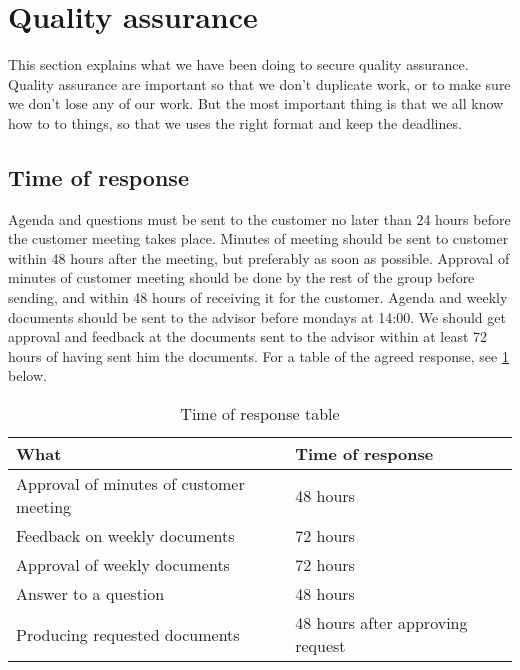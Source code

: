 \section{Quality assurance}
This section explains what we have been doing to secure quality assurance. Quality assurance are important so that we don't duplicate work, or to make sure we don't  lose any of our work. But the most important thing is that we all know how to to things, so that we uses the right format and keep the deadlines.

\newpage

\subsection{Time of response}
Agenda and questions must be sent to the customer no later than 24 hours before the customer meeting takes place. 
Minutes of meeting should be sent to customer within 48 hours after the meeting, but preferably as soon as possible.
Approval of minutes of customer meeting should be done by the rest of the group before sending, and within 48 hours of receiving it for the customer. Agenda and weekly documents should be sent to the advisor before mondays at 14:00.
We should get approval and feedback at the documents sent to the advisor within at least 72 hours of having sent him the documents.
\newline
\newline
For a table of the agreed response, see \ref{tab:responsetable} below.

\begin{table}[h!]
\begin{center}
\begin{tabular}{l|l} \hline
What & Time of response \\ \hline \hline
Approval of minutes of customer meeting & 48 hours \\
Feedback on weekly documents & 72 hours \\
Approval of weekly documents & 72 hours \\
Answer to a question & 48 hours \\
Producing requested documents & 48 hours after approving request \\ \hline
\end{tabular}
\end{center}
\caption{Time of response table}\label{tab:responsetable}
\end{table}

